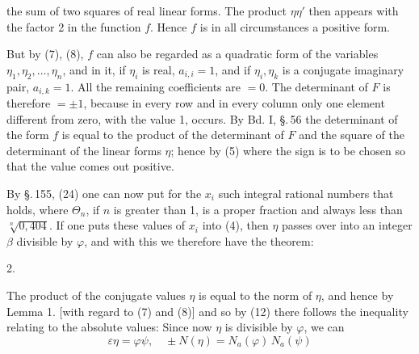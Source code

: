 the sum of two squares of real linear forms. The product
$\eta \eta'$ then appears with the factor 2 in the function $f$.
Hence $f$ is in all circumstances a positive form.

But by (7), (8), $f$ can also be regarded as a quadratic form
of the variables $\eta_1, \eta_2, \ldots, \eta_n$,
and in it, if $\eta_i$ is real, $a_{i,i} = 1$, and if
$\eta_i, \eta_k$ is a conjugate imaginary pair, $a_{i,k} = 1$. All the remaining
coefficients are $= 0$. The determinant of $F$ is therefore $= \pm 1$,
because in every row and in every column only one element
different from zero, with the value 1, occurs. By Bd. I,
\S.\,56 the determinant of the form $f$ is equal to the product of the
determinant of $F$ and the square of the determinant of the
linear forms $\eta$; hence by (5)
where the sign is to be chosen so that the value comes out positive.

By \S.\,155, (24) one can now put for the $x_i$ such integral
rational numbers that
holds, where $\Theta_n$, if $n$ is greater than 1, is a proper fraction and
always less than $\sqrt[n]{0{,}404}$. If one puts these values of $x_i$ into
(4), then $\eta$ passes over into an integer $\beta$ divisible by $\varphi$,
and with this we therefore have the theorem:

2. 

The product of the conjugate values $\eta$ is equal to the norm
of $\eta$, and hence by Lemma 1. [with regard to
(7) and (8)]
and so by (12) there follows the inequality relating to the
absolute values:
Since now $\eta$ is divisible by $\varphi$, we can
\[ \varepsilon \eta = \varphi \psi, \quad \pm N(\eta) = N_a(\varphi)\, N_a(\psi) \]
